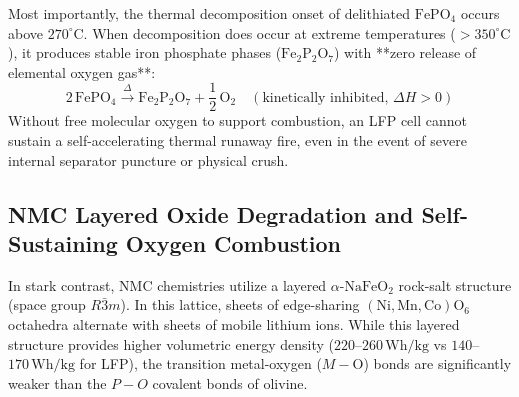 Most importantly, the thermal decomposition onset of delithiated $\mathrm{FePO}_4$ occurs above $270^\circ\mathrm{C}$. When decomposition does occur at extreme temperatures ($>350^\circ\mathrm{C}$), it produces stable iron phosphate phases ($\mathrm{Fe}_2\mathrm{P}_2\mathrm{O}_7$) with **zero release of elemental oxygen gas**:
\begin{equation}
2\,\mathrm{FePO}_4 \xrightarrow{\Delta} \mathrm{Fe}_2\mathrm{P}_2\mathrm{O}_7 + \frac{1}{2}\,\mathrm{O}_2 \quad (\text{kinetically inhibited, } \Delta H > 0)
\label{eq:lfp_thermal_decomp}
\end{equation}
Without free molecular oxygen to support combustion, an LFP cell cannot sustain a self-accelerating thermal runaway fire, even in the event of severe internal separator puncture or physical crush.

\subsection{NMC Layered Oxide Degradation and Self-Sustaining Oxygen Combustion}

In stark contrast, NMC chemistries utilize a layered $\alpha$-$\mathrm{NaFeO}_2$ rock-salt structure (space group $R\bar{3}m$). In this lattice, sheets of edge-sharing $(\mathrm{Ni, Mn, Co})\mathrm{O}_6$ octahedra alternate with sheets of mobile lithium ions. While this layered structure provides higher volumetric energy density ($220$--$260\,\mathrm{Wh/kg}$ vs $140$--$170\,\mathrm{Wh/kg}$ for LFP), the transition metal-oxygen ($M-\mathrm{O}$) bonds are significantly weaker than the $P-O$ covalent bonds of olivine.

